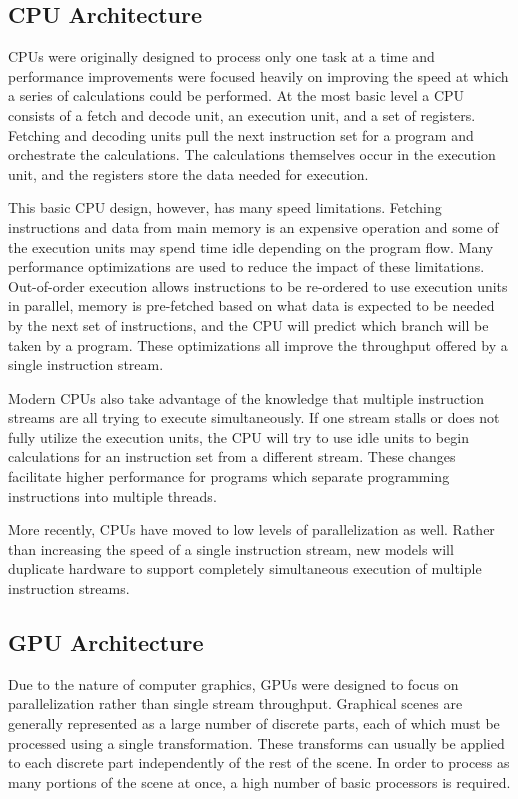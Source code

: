 \subsection{CPU Architecture}

CPUs were originally designed to process only one task at a time and performance improvements were focused heavily on improving the speed at which a series of calculations could be performed. At the most basic level a CPU consists of a fetch and decode unit, an execution unit, and a set of registers. Fetching and decoding units pull the next instruction set for a program and orchestrate the calculations. The calculations themselves occur in the execution unit, and the registers store the data needed for execution. \cite{GPGPU}

This basic CPU design, however, has many speed limitations. Fetching instructions and data from main memory is an expensive operation and some of the execution units may spend time idle depending on the program flow. Many performance optimizations are used to reduce the impact of these limitations. Out-of-order execution allows instructions to be re-ordered to use execution units in parallel, memory is pre-fetched based on what data is expected to be needed by the next set of instructions, and the CPU will predict which branch will be taken by a program. These optimizations all improve the throughput offered by a single instruction stream.

Modern CPUs also take advantage of the knowledge that multiple instruction streams are all trying to execute simultaneously. If one stream stalls or does not fully utilize the execution units, the CPU will try to use idle units to begin calculations for an instruction set from a different stream. These changes facilitate higher performance for programs which separate programming instructions into multiple threads.

More recently, CPUs have moved to low levels of parallelization as well. Rather than increasing the speed of a single instruction stream, new models will duplicate hardware to support completely simultaneous execution of multiple instruction streams.

\subsection{GPU Architecture}

Due to the nature of computer graphics, GPUs were designed to focus on parallelization rather than single stream throughput. Graphical scenes are generally represented as a large number of discrete parts, each of which must be processed using a single transformation. These transforms can usually be applied to each discrete part independently of the rest of the scene. In order to process as many portions of the scene at once, a high number of basic processors is required. \cite{GPGPU}

